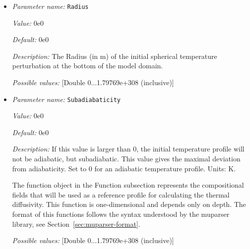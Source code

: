 \begin{itemize}
{\it Value:} center


{\it Default:} center


{\it Description:} Where the initial temperature perturbation should be placed. If 'center' is given, then the perturbation will be centered along a 'midpoint' of some sort of the bottom boundary. For example, in the case of a box geometry, this is the center of the bottom face; in the case of a spherical shell geometry, it is along the inner surface halfway between the bounding radial lines.


{\it Possible values:} [Selection center ]
\item {\it Parameter name:} {\tt Radius}
\label{parameters:Initial conditions/Adiabatic/Radius}


{\it Value:} 0e0


{\it Default:} 0e0


{\it Description:} The Radius (in m) of the initial spherical temperature perturbation at the bottom of the model domain.


{\it Possible values:} [Double 0...1.79769e+308 (inclusive)]
\item {\it Parameter name:} {\tt Subadiabaticity}
\label{parameters:Initial conditions/Adiabatic/Subadiabaticity}


{\it Value:} 0e0


{\it Default:} 0e0


{\it Description:} If this value is larger than 0, the initial temperature profile will not be adiabatic, but subadiabatic. This value gives the maximal deviation from adiabaticity. Set to 0 for an adiabatic temperature profile. Units: K.

The function object in the Function subsection represents the compositional fields that will be used as a reference profile for calculating the thermal diffusivity. This function is one-dimensional and depends only on depth. The format of this functions follows the syntax understood by the muparser library, see Section~\ref{sec:muparser-format}.


{\it Possible values:} [Double 0...1.79769e+308 (inclusive)]
\end{itemize}



